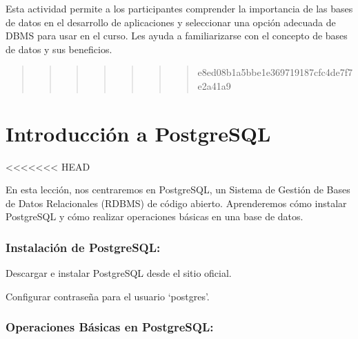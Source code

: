 \documentclass[
  a4paper,
  DIV=11,
  numbers=noendperiod,
  onepage,
  openany]{scrreprt}
\begin{document}
Esta actividad permite a los participantes comprender la importancia de
las bases de datos en el desarrollo de aplicaciones y seleccionar una
opción adecuada de DBMS para usar en el curso. Les ayuda a
familiarizarse con el concepto de bases de datos y sus beneficios.

\begin{quote}
\begin{quote}
\begin{quote}
\begin{quote}
\begin{quote}
\begin{quote}
\begin{quote}
e8ed08b1a5bbe1e369719187cfc4de7f7e2a41a9
\end{quote}
\end{quote}
\end{quote}
\end{quote}
\end{quote}
\end{quote}
\end{quote}

\hypertarget{introducciuxf3n-a-postgresql}{%
\chapter{Introducción a PostgreSQL}\label{introducciuxf3n-a-postgresql}}

\textless\textless\textless\textless\textless\textless\textless{} HEAD

En esta lección, nos centraremos en PostgreSQL, un Sistema de Gestión de
Bases de Datos Relacionales (RDBMS) de código abierto. Aprenderemos cómo
instalar PostgreSQL y cómo realizar operaciones básicas en una base de
datos.

\hypertarget{instalaciuxf3n-de-postgresql}{%
\subsection{Instalación de
PostgreSQL:}\label{instalaciuxf3n-de-postgresql}}

Descargar e instalar PostgreSQL desde el sitio oficial.

Configurar contraseña para el usuario `postgres'.

\hypertarget{operaciones-buxe1sicas-en-postgresql}{%
\subsection{Operaciones Básicas en
PostgreSQL:}\label{operaciones-buxe1sicas-en-postgresql}}
\end{document}
